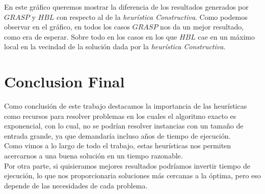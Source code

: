 \documentclass[a4paper, 10pt]{article}
\begin{document}
En este gr\'afico queremos mostrar la diferencia de los resultados generados por $GRASP$ y $HBL$ con respecto al de la \textit{heur\'istica Constructiva}. Como podemos observar en el gr\'afico, en todos los casos $GRASP$ nos da un mejor resultado, como era de esperar. Sobre todo en los casos en los que $HBL$ cae en un m\'aximo local en la vecindad de la soluci\'on dada por la \textit{heur\'istica Constructiva}. \\

\section{Conclusion Final}
Como conclusi\'on de este trabajo destacamos la importancia de las heur\'isticas como recursos para resolver problemas en los cuales el algoritmo exacto es exponencial, con lo cual, no se podr\'ian resolver instancias con un tama\~no de entrada grande, ya que demandar\'ia incluso a\~nos de tiempo de ejecuci\'on. \\ 

Como vimos a lo largo de todo el trabajo, estas heur\'isticas nos permiten acercarnos a una buena soluci\'on en un tiempo razonable. \\
Por otra parte, si quisieramos mejores resultados podr\'iamos invertir tiempo de ejecuci\'on, lo que nos proporcionaria soluciones m\'as cercanas a la \'optima, pero eso depende de las necesidades de cada problema. \\
\end{document}
